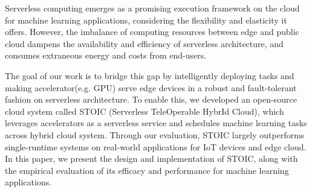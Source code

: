 Serverless computing emerges as a promising execution framework on the cloud for machine learning applications, considering the flexibility and elasticity it offers. However, the imbalance of computing resources between edge and public cloud dampens the availability and efficiency of serverless architecture, and consumes extraneous energy and costs from end-users. 

The goal of our work is to bridge this gap by intelligently deploying tasks and making accelerator(e.g. GPU) serve edge devices in a robust and fault-tolerant fashion on serverless architecture. To enable this, we developed an open-source cloud system called STOIC (Serverless TeleOperable HybrId Cloud), which leverages accelerators as a serverless service and schedules machine learning tasks across hybrid cloud system. Through our evaluation, STOIC largely outperforms single-runtime systems on real-world applications for IoT devices and edge cloud. In this paper, we present the design and implementation of STOIC, along with the empirical evaluation of its efficacy and performance for machine learning applications.